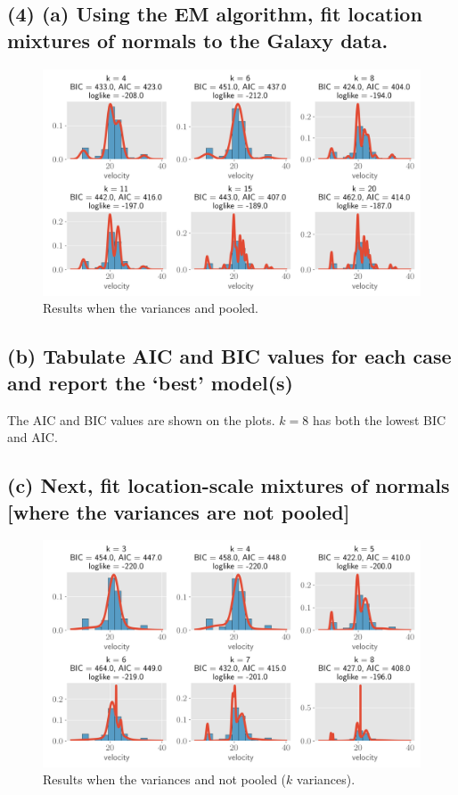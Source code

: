 \documentclass[11pt]{article}
\begin{document}
\subsection*{(4) (a) Using the EM algorithm, fit location mixtures of normals to the Galaxy data.}

\begin{figure}[!h]
    \centering
    \includegraphics[scale=.6
    ]{homework_4/figures/galaxies_1.png}
    \caption{Results when the variances and pooled.}
    \label{fig:my_label}
\end{figure}
\newpage

\subsection*{(b) Tabulate AIC and BIC values for each case and report the ‘best’ model(s)}

The AIC and BIC values are shown on the plots. $k =8$ has both the lowest BIC and AIC.

\subsection*{(c) Next, fit location-scale mixtures of normals [where the variances are not pooled]}

\begin{figure}[!h]
    \centering
    \includegraphics[scale=.6
    ]{homework_4/figures/galaxies_2.png}
    \caption{Results when the variances and not pooled ($k$ variances).}
    \label{fig:my_label}
\end{figure}
\end{document}
